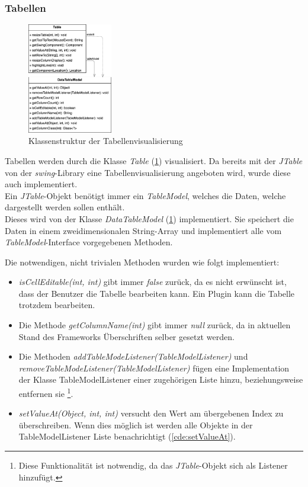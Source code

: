\subsubsection{Tabellen}
\begin{figure}
  \centering
  \vspace{-20pt}
  \includegraphics[width=0.33\textwidth]{fig/GUI_Table_classes.png}
  \caption{Klassenstruktur der Tabellenvisualisierung}
  \label{fig:table-classes}
  \vspace{-20pt}
\end{figure}

Tabellen werden durch die Klasse \textit{Table} (\cref{fig:table-classes}) visualisiert. Da bereits
mit der \textit{JTable} von der \textit{swing}-Library eine
Tabellenvisualisierung angeboten wird, wurde diese auch implementiert.\\
Ein \textit{JTable}-Objekt benötigt immer ein \textit{TableModel}, welches
die Daten, welche dargestellt werden sollen enthält.\\
Dieses wird von der Klasse \textit{DataTableModel} (\cref{fig:table-classes}) implementiert.
Sie speichert die Daten in einem zweidimensionalen String-Array und implementiert
alle vom \textit{TableModel}-Interface vorgegebenen Methoden.

Die notwendigen, nicht trivialen Methoden wurden wie folgt implementiert:
\begin{itemize}
  \item \textit{isCellEditable(int, int)} gibt immer \textit{false} zurück,
    da es nicht erwünscht ist, dass der Benutzer die Tabelle bearbeiten kann.
    Ein Plugin kann die Tabelle trotzdem bearbeiten.
  \item Die Methode \textit{getColumnName(int)} gibt immer \textit{null} zurück,
    da in aktuellen Stand des Frameworks Überschriften selber gesetzt werden.
  \item Die Methoden \textit{addTableModeListener(TableModelListener)} und
    \textit{removeTableModeListener(TableModelListener)} fügen eine Implementation
    der Klasse TableModelListener einer zugehörigen Liste hinzu, beziehungsweise
    entfernen sie
    \footnote{Diese Funktionalität ist notwendig, da das \textit{JTable}-Objekt sich als Listener hinzufügt.}.
  \item \textit{setValueAt(Object, int, int)} versucht den Wert am übergebenen Index
    zu überschreiben. Wenn dies möglich ist werden alle
    Objekte in der TableModelListener Liste benachrichtigt (\cref{cde:setValueAt}).
\end{itemize}


